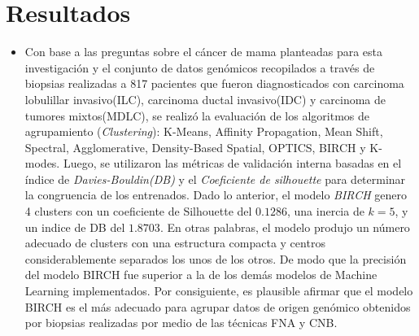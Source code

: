 \section{Resultados}
\begin{itemize}[label=\HandPencilLeft]
	\item Con base a las preguntas sobre el cáncer de mama planteadas para esta investigación y el conjunto de datos genómicos recopilados a través de biopsias realizadas a 817 pacientes que fueron diagnosticados con carcinoma lobulillar invasivo(ILC), carcinoma ductal invasivo(IDC) y carcinoma de tumores mixtos(MDLC), se realizó la evaluación de los algoritmos de agrupamiento (\textit{Clustering}): K-Means, Affinity Propagation, Mean Shift, Spectral, Agglomerative, Density-Based Spatial, OPTICS, BIRCH y K-modes. Luego, se utilizaron las métricas de validación interna basadas en el índice de \textit{Davies-Bouldin(DB)} y el \textit{Coeficiente de silhouette} para determinar la congruencia de los  entrenados. Dado lo anterior, el modelo \textit{BIRCH} genero 4 clusters con un coeficiente de Silhouette del $0.1286$, una inercia de $k = 5 $, y un indice de DB del $1.8703$. En otras palabras, el modelo produjo un número adecuado de clusters con una estructura compacta y centros considerablemente separados los unos de los otros. De modo que la precisión del modelo BIRCH fue superior a la de los demás modelos de Machine Learning implementados. Por consiguiente, es plausible afirmar que el modelo BIRCH es el más adecuado para agrupar datos de origen genómico obtenidos por biopsias realizadas por medio de las técnicas FNA y CNB.
\end{itemize}


